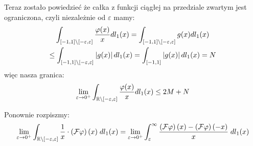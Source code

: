 \documentclass[11pt]{scrartcl}
\begin{document}
\begin{walk}
            Teraz zostało powiedzieć że całka z funkcji ciągłej na przedziale zwartym 
            jest ograniczona, czyli niezależnie od $\varepsilon$ mamy:
            \begin{gather*}
                \int_{[-1,1] \backslash [-\varepsilon, \varepsilon]} \frac{\varphi (x)}{x} dl_1 (x) =
                \int_{[-1,1] \backslash [-\varepsilon, \varepsilon]} g(x) dl_1 (x) \\
                \leq \int_{[-1,1] \backslash [-\varepsilon, \varepsilon]} \left\lvert  g(x) \right\rvert dl_1 (x) =
                \int_{[-1,1]} \left\lvert g(x) \right\rvert dl_1 (x) = N
            \end{gather*}
            więc nasza granica:
            \begin{gather*}
               \lim_{\varepsilon \to 0^+} \int_{\mathbb R \backslash [-\varepsilon, \varepsilon]} 
                   \frac{\varphi (x)}{x} dl_1 (x) \leq
                2M + N
            \end{gather*}
            
        \item Ponownie rozpiszmy:
            \begin{gather*}
                \lim_{\varepsilon \to 0^+} \int_{\mathbb R \backslash [-\varepsilon, \varepsilon]} 
                    \frac{1}{x} \cdot \left ( \mathcal{F} \varphi  \right ) (x) \; dl_1 (x) =
                \lim_{\varepsilon \to 0^+} \int_{\varepsilon}^{\infty}
                    \frac{ 
                        \left ( \mathcal{F} \varphi  \right ) (x) - 
                        \left ( \mathcal{F} \varphi \right ) (-x) 
                    }{x} \; dl_1 (x)
            \end{gather*}


\end{walk}
\end{document}
